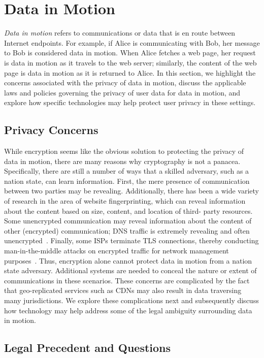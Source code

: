 \section{Data in Motion}
\label{sec:motion}

{\em Data in motion} refers to communications or data that is en route between
Internet endpoints. For example, if Alice is communicating with Bob, her
message to Bob is considered data in motion.  When Alice fetches a web page,
her request is data in motion as it travels to the web server; similarly, the
content of the web page is data in motion as it is returned to Alice. In this
section, we highlight the concerns associated with the privacy of data in
motion, discuss the applicable laws and policies governing the privacy of user
data for data in motion, and explore how specific technologies may help protect
user privacy in these settings.

\subsection{Privacy Concerns}

While encryption seems like the obvious solution to protecting the privacy of
data in motion, there are many reasons why cryptography is not a panacea.
Specifically, there are still a number of ways that a skilled adversary, such
as a nation state, can learn information.  First, the mere presence of
communication between two parties may be revealing.  Additionally, there has
been a wide variety of research in the area of website fingerprinting, which
can reveal information about the content based on size, content, and location
of third- party resources.  Some unencrypted communication may reveal
information about the content of other (encrypted) communication; DNS traffic
is extremely revealing and often unencrypted~\cite{isps_see}.  Finally, some
ISPs terminate TLS connections, thereby conducting man-in-the-middle attacks
on encrypted traffic for network management purposes~\cite{gogo}. Thus,
encryption alone cannot protect data in motion from a nation state adversary.
Additional systems are needed to conceal the nature or extent of
communications in these scenarios. These concerns are complicated by the fact
that geo-replicated services such as CDNs may also result in data traversing
many jurisdictions.  We explore these complications next and subsequently
discuss how technology may help address some of the legal ambiguity
surrounding data in motion.

\subsection{Legal Precedent and Questions}

